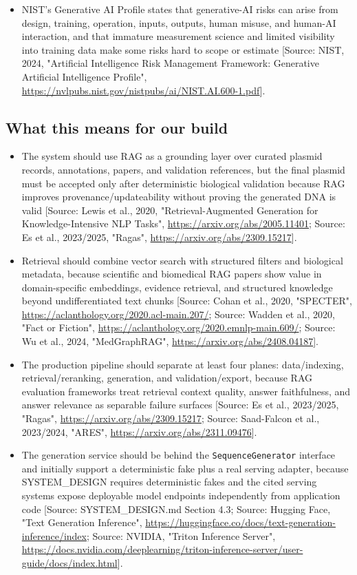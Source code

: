 \documentclass[11pt]{report}
\begin{document}
\begin{itemize}
\item NIST's Generative AI Profile states that generative-AI risks can arise from design, training, operation, inputs, outputs, human misuse, and human-AI interaction, and that immature measurement science and limited visibility into training data make some risks hard to scope or estimate [Source: NIST, 2024, "Artificial Intelligence Risk Management Framework: Generative Artificial Intelligence Profile", \url{https://nvlpubs.nist.gov/nistpubs/ai/NIST.AI.600-1.pdf}].
\end{itemize}

\subsection{What this means for our build}
\begin{itemize}
\item The system should use RAG as a grounding layer over curated plasmid records, annotations, papers, and validation references, but the final plasmid must be accepted only after deterministic biological validation because RAG improves provenance/updateability without proving the generated DNA is valid [Source: Lewis et al., 2020, "Retrieval-Augmented Generation for Knowledge-Intensive NLP Tasks", \url{https://arxiv.org/abs/2005.11401}; Source: Es et al., 2023/2025, "Ragas", \url{https://arxiv.org/abs/2309.15217}].
\item Retrieval should combine vector search with structured filters and biological metadata, because scientific and biomedical RAG papers show value in domain-specific embeddings, evidence retrieval, and structured knowledge beyond undifferentiated text chunks [Source: Cohan et al., 2020, "SPECTER", \url{https://aclanthology.org/2020.acl-main.207/}; Source: Wadden et al., 2020, "Fact or Fiction", \url{https://aclanthology.org/2020.emnlp-main.609/}; Source: Wu et al., 2024, "MedGraphRAG", \url{https://arxiv.org/abs/2408.04187}].
\item The production pipeline should separate at least four planes: data/indexing, retrieval/reranking, generation, and validation/export, because RAG evaluation frameworks treat retrieval context quality, answer faithfulness, and answer relevance as separable failure surfaces [Source: Es et al., 2023/2025, "Ragas", \url{https://arxiv.org/abs/2309.15217}; Source: Saad-Falcon et al., 2023/2024, "ARES", \url{https://arxiv.org/abs/2311.09476}].
\item The generation service should be behind the \texttt{SequenceGenerator} interface and initially support a deterministic fake plus a real serving adapter, because SYSTEM\_DESIGN requires deterministic fakes and the cited serving systems expose deployable model endpoints independently from application code [Source: SYSTEM\_DESIGN.md Section 4.3; Source: Hugging Face, "Text Generation Inference", \url{https://huggingface.co/docs/text-generation-inference/index}; Source: NVIDIA, "Triton Inference Server", \url{https://docs.nvidia.com/deeplearning/triton-inference-server/user-guide/docs/index.html}].

\end{itemize}
\end{document}
